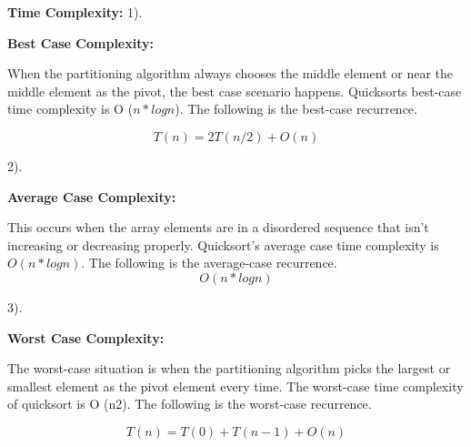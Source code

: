 \documentclass[12pt,a4paper]{article}
\begin{document}
\vspace{1cm }
\textbf{Time Complexity: }
1).\begin{large} \textbf{Best Case Complexity:}\end{large}  When the partitioning algorithm always chooses the middle element or near the middle element as the pivot, the best case scenario happens. Quicksorts best-case time complexity is O ($ n*logn $). The following is the best-case recurrence.


\begin{equation}
T(n) = 2T(n/2) + O(n)
\end{equation} 

2). \begin{large} \textbf{Average Case Complexity:}\end{large} This occurs when the array elements are in a disordered sequence that isn’t increasing or decreasing properly. Quicksort’s average case time complexity is $ O(n*logn) $. The following is the average-case recurrence.
\begin{equation}
O(n*logn)
\end{equation}


3). \begin{large} \textbf{Worst Case Complexity:}\end{large} The worst-case situation is when the partitioning algorithm picks the largest or smallest element as the pivot element every time. The worst-case time complexity of quicksort is O (n2). The following is the worst-case recurrence.

\begin{equation}
T(n) = T(0) + T(n-1) + O(n) 
\end{equation}
\end{document}
